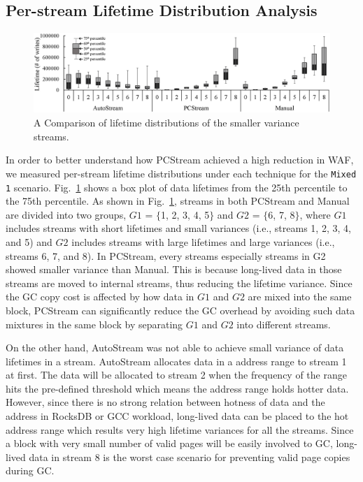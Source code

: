 \subsection{Per-stream Lifetime Distribution Analysis}

\begin{figure}[t]
	\centering
	\includegraphics[width=1\linewidth]{figure/distribution}
	\caption{A Comparison of lifetime distributions of the smaller variance streams.}
	\label{fig:distribution}
\end{figure}

In order to better understand how \textsf{\small PCStream} achieved a high reduction in WAF, 
we measured per-stream lifetime distributions under each 
technique for the \texttt{Mixed 1} scenario.
Fig.~\ref{fig:distribution} shows a box plot of data lifetimes from the 
25th percentile to the 75th percentile.
As shown in Fig.~\ref{fig:distribution}, 
streams in both \textsf{\small PCStream} and Manual are divided into two groups, 
$G1$ = $\{$1, 2, 3, 4, 5$\}$ and $G2$ = $\{$6, 7, 8$\}$, 
where $G1$ includes streams with short lifetimes and small variances 
(i.e., streams 1, 2, 3, 4, and 5) 
and $G2$ includes streams with large lifetimes and large variances (i.e., streams 6, 7, and 8).  
In PCStream, every streams especially streams in G2 showed smaller variance than 
Manual.
This is because long-lived data in those streams are moved to internal streams, thus 
reducing the lifetime variance.
Since the GC copy cost is affected by how data in $G1$ and $G2$ are mixed into the same block, 
\textsf{\small PCStream} can significantly reduce the GC overhead 
by avoiding such data mixtures in the same block by separating $G1$ and $G2$ into different streams. 

On the other hand, AutoStream was not able to achieve small variance of data lifetimes in a stream.
AutoStream allocates data in a address range to stream 1 at first.
The data will be allocated to stream 2 when the frequency of the range hits the 
pre-defined threshold which means the address range holds hotter data.
However, since there is no strong relation between hotness of data and the address in RocksDB
or GCC workload, 
long-lived data can be placed to the hot address range which results 
very high lifetime variances for all the streams.
Since a block with very small number of valid pages will be easily involved to GC,
long-lived data in stream 8 is the worst case scenario 
for preventing valid page copies during GC.

